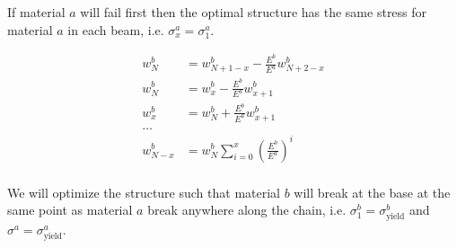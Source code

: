 If material $a$ will fail first then the optimal structure has the same stress for material $a$ in each beam, i.e. $\sigma_x^a = \sigma_1^a$.

\begin{align*}
	w_N^b &= w_{N+1-x}^b - \frac{E^b}{E^a} w^b_{N+2-x} \\
	w_N^b &= w_{x}^b - \frac{E^b}{E^a} w^b_{x+1} \\
	w_{x}^b &= w_N^b + \frac{E^b}{E^a} w^b_{x+1} \\
	\dots \\
	w^b_{N-x} &= w^b_N \sum\limits_{i=0}^x \left(\frac{E^b}{E^a}\right)^i \\
\end{align*}

We will optimize the structure such that material $b$ will break at the base at the same point as material $a$ break anywhere along the chain, i.e. $\sigma^b_1 = \sigma^b_\text{yield}$ and $\sigma^a  = \sigma^a_\text{yield}$.

